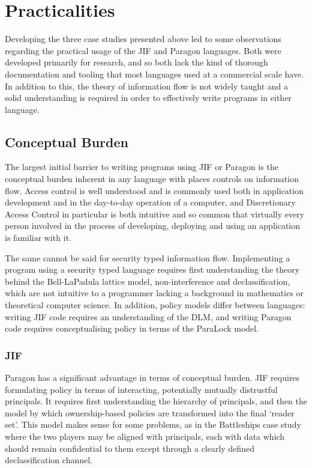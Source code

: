 \section{Practicalities} \label{sect_practicalities}

Developing the three case studies presented above led to some observations regarding the practical usage of the JIF and Paragon languages. Both were developed primarily for research, and so both lack the kind of thorough documentation and tooling that most languages used at a commercial scale have. In addition to this, the theory of information flow is not widely taught and a solid understanding is required in order to effectively write programs in either language.

\subsection{Conceptual Burden}

The largest initial barrier to writing programs using JIF or Paragon is the conceptual burden inherent in any language with places controls on information flow. Access control is well understood and is commonly used both in application development and in the day-to-day operation of a computer, and Discretionary Access Control in particular is both intuitive and so common that virtually every person involved in the process of developing, deploying and using an application is familiar with it.

The same cannot be said for security typed information flow. Implementing a program using a security typed language requires first understanding the theory behind the Bell-LaPadula lattice model, non-interference and declassification, which are not intuitive to a programmer lacking a background in mathematics or theoretical computer science. In addition, policy models differ between languages: writing JIF code requires an understanding of the DLM, and writing Paragon code requires conceptualising policy in terms of the ParaLock model.

\subsubsection{JIF}

Paragon has a significant advantage in terms of conceptual burden. JIF requires formulating policy in terms of interacting, potentially mutually distrustful principals. It requires first understanding the hierarchy of principals, and then the model by which ownership-based policies are transformed into the final `reader set'. This model makes sense for some problems, as in the Battleships case study where the two players may be aligned with principals, each with data which should remain confidential to them except through a clearly defined declassification channel.

